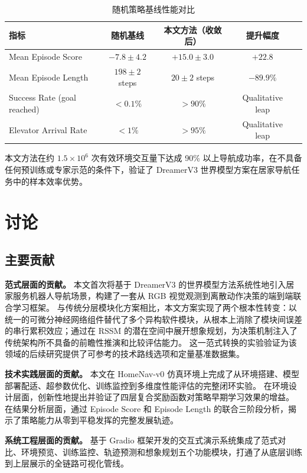 \documentclass[12pt,a4paper]{ctexart}
\begin{document}
\begin{table}[H]
    \centering
    \caption{随机策略基线性能对比}
    \label{tab:baseline}
    \begin{tabular}{@{}lcccc@{}}
        \toprule
        \textbf{指标} & \textbf{随机基线} & \textbf{本文方法（收敛后）} & \textbf{提升幅度} \\
        \midrule
        Mean Episode Score & $-7.8 \pm 4.2$ & $+15.0 \pm 3.0$ & $+22.8$ \\
        Mean Episode Length & $198 \pm 2$ steps & $20 \pm 2$ steps & $-89.9\%$ \\
        Success Rate (goal reached) & $< 0.1\%$ & $> 90\%$ & Qualitative leap \\
        Elevator Arrival Rate & $< 1\%$ & $> 95\%$ & Qualitative leap \\
        \bottomrule
    \end{tabular}
\end{table}

本文方法在约 $1.5 \times 10^6$ 次有效环境交互量下达成 90\% 以上导航成功率，在不具备任何预训练或专家示范的条件下，验证了 DreamerV3 世界模型方案在居家导航任务中的样本效率优势。

\section{讨论}

\subsection{主要贡献}

\textbf{范式层面的贡献。}
本文首次将基于 DreamerV3 的世界模型方法系统性地引入居家服务机器人导航场景，构建了一套从 RGB 视觉观测到离散动作决策的端到端联合学习框架。
与传统分层模块化方案相比，本文方案实现了两个根本性转变：以统一的可微分神经网络组件替代了多个异构软件模块，从根本上消除了模块间误差的串行累积效应；通过在 RSSM 的潜在空间中展开想象规划，为决策机制注入了传统架构所不具备的前瞻性推演和比较评估能力。
这一范式转换的实验验证为该领域的后续研究提供了可参考的技术路线选项和定量基准数据集。

\textbf{技术实践层面的贡献。}
本文在 HomeNav-v0 仿真环境上完成了从环境搭建、模型部署配适、超参数优化、训练监控到多维度性能评估的完整闭环实验。
在环境设计层面，创新性地提出并验证了四层复合奖励函数对策略早期学习效果的增益。
在结果分析层面，通过 Episode Score 和 Episode Length 的联合三阶段分析，揭示了策略能力从零到平稳发挥的完整发展轨迹。

\textbf{系统工程层面的贡献。}
基于 Gradio 框架开发的交互式演示系统集成了范式对比、环境预览、训练监控、轨迹预测和想象规划五个功能模块，打通了从底层训练到上层展示的全链路可视化管线。
\end{document}
